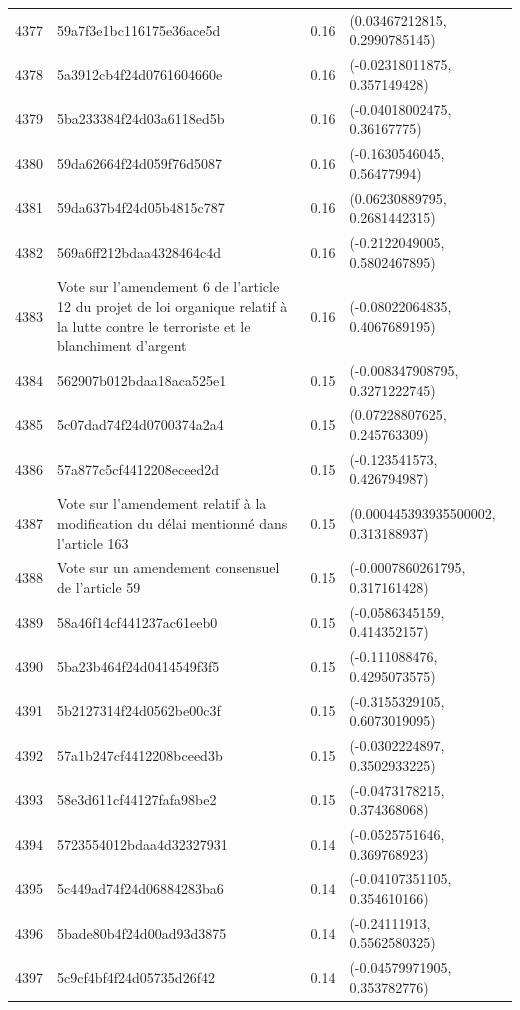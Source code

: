 \begin{table}[ht]
\begin{tabular}{rlrl}
  4377 & 59a7f3e1bc116175e36ace5d & 0.16 & (0.03467212815, 0.2990785145) \\ 
  4378 & 5a3912cb4f24d0761604660e & 0.16 & (-0.02318011875, 0.357149428) \\ 
  4379 & 5ba233384f24d03a6118ed5b & 0.16 & (-0.04018002475, 0.36167775) \\ 
  4380 & 59da62664f24d059f76d5087 & 0.16 & (-0.1630546045, 0.56477994) \\ 
  4381 & 59da637b4f24d05b4815c787 & 0.16 & (0.06230889795, 0.2681442315) \\ 
  4382 & 569a6ff212bdaa4328464c4d & 0.16 & (-0.2122049005, 0.5802467895) \\ 
  4383 & Vote sur l'amendement 6 de l'article 12 du projet de loi organique relatif à la lutte contre le terroriste et le blanchiment d'argent & 0.16 & (-0.08022064835, 0.4067689195) \\ 
  4384 & 562907b012bdaa18aca525e1 & 0.15 & (-0.008347908795, 0.3271222745) \\ 
  4385 & 5c07dad74f24d0700374a2a4 & 0.15 & (0.07228807625, 0.245763309) \\ 
  4386 & 57a877c5cf4412208eceed2d & 0.15 & (-0.123541573, 0.426794987) \\ 
  4387 & Vote sur l'amendement relatif à la modification du délai mentionné dans l'article 163 & 0.15 & (0.000445393935500002, 0.313188937) \\ 
  4388 & Vote sur un amendement consensuel de l'article 59 & 0.15 & (-0.0007860261795, 0.317161428) \\ 
  4389 & 58a46f14cf441237ac61eeb0 & 0.15 & (-0.0586345159, 0.414352157) \\ 
  4390 & 5ba23b464f24d0414549f3f5 & 0.15 & (-0.111088476, 0.4295073575) \\ 
  4391 & 5b2127314f24d0562be00c3f & 0.15 & (-0.3155329105, 0.6073019095) \\ 
  4392 & 57a1b247cf4412208bceed3b & 0.15 & (-0.0302224897, 0.3502933225) \\ 
  4393 & 58e3d611cf44127fafa98be2 & 0.15 & (-0.0473178215, 0.374368068) \\ 
  4394 & 5723554012bdaa4d32327931 & 0.14 & (-0.0525751646, 0.369768923) \\ 
  4395 & 5c449ad74f24d06884283ba6 & 0.14 & (-0.04107351105, 0.354610166) \\ 
  4396 & 5bade80b4f24d00ad93d3875 & 0.14 & (-0.24111913, 0.5562580325) \\ 
  4397 & 5c9cf4bf4f24d05735d26f42 & 0.14 & (-0.04579971905, 0.353782776) \\ 

\end{tabular}
\end{table}
